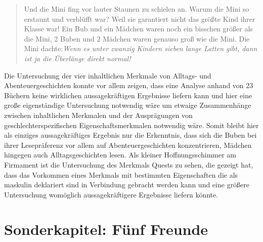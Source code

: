\begin{quote}
Und die Mini fing vor lauter Staunen zu schielen an. \textelp{} Warum
die Mini so erstaunt und verblüfft war? Weil sie garantiert nicht das
größte Kind ihrer Klasse war! Ein Bub und ein Mädchen waren noch ein
bisschen größer als die Mini, 2 Buben und 2 Mädchen waren genauso groß
wie die Mini. Die Mini
dachte:\emph{Wenn es unter zwanzig Kindern sieben \emph{lange Latten} gibt, dann ist ja die Überlänge direkt normal!}\parencite[][61]{Noestlinger2011}
\end{quote}

Die Untersuchung der vier inhaltlichen Merkmale von Alltags- und
Abenteuergeschichten konnte vor allem zeigen, dass eine Analyse anhand
von 23 Büchern keine wirklichen aussagekräftigen Ergebnisse liefern kann
und hier eine große eigenständige Untersuchung notwendig wäre um etwaige
Zusammenhänge zwischen inhaltlichen Merkmalen und der Ausprägungen von
geschlechterspezifischen Eigenschaftsmerkmalen notwendig wäre. Somit
bleibt hier als einziges aussagekräftiges Ergebnis nur die Erkenntnis,
dass sich die Buben bei ihrer Lesepräferenz vor allem auf
Abenteuergeschichten konzentrieren, Mädchen hingegen auch
Alltagsgeschichten lesen. Als kleiner Hoffnungsschimmer am Firmament ist
die Untersuchung des Merkmals Quests zu sehen, die gezeigt hat, dass das
Vorkommen eines Merkmals mit bestimmten Eigenschaften die als maskulin
deklariert sind in Verbindung gebracht werden kann und eine größere
Untersuchung womöglich aussagekräftigere Ergebnisse liefern könnte.

\section{Sonderkapitel: Fünf Freunde}

